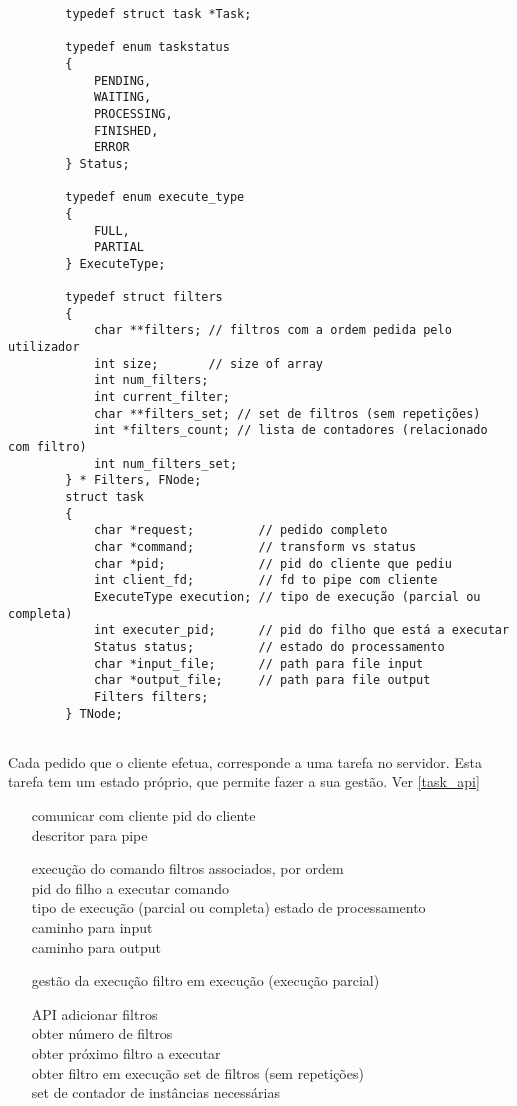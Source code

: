 \documentclass{article}
\begin{document}
\begin{verbatim}
        typedef struct task *Task;

        typedef enum taskstatus
        {
            PENDING,
            WAITING,
            PROCESSING,
            FINISHED,
            ERROR
        } Status;

        typedef enum execute_type
        {
            FULL,
            PARTIAL
        } ExecuteType;

        typedef struct filters
        {
            char **filters; // filtros com a ordem pedida pelo utilizador
            int size;       // size of array
            int num_filters;
            int current_filter;
            char **filters_set; // set de filtros (sem repetições)
            int *filters_count; // lista de contadores (relacionado com filtro)
            int num_filters_set;
        } * Filters, FNode;
        struct task
        {
            char *request;         // pedido completo
            char *command;         // transform vs status
            char *pid;             // pid do cliente que pediu
            int client_fd;         // fd to pipe com cliente
            ExecuteType execution; // tipo de execução (parcial ou completa)
            int executer_pid;      // pid do filho que está a executar
            Status status;         // estado do processamento
            char *input_file;      // path para file input
            char *output_file;     // path para file output
            Filters filters;
        } TNode;
    
\end{verbatim}

Cada pedido que o cliente efetua, corresponde a uma tarefa no servidor. Esta tarefa tem um estado próprio,
que permite fazer a sua gestão. Ver \ref{task_api}

\begin{itemize}
    \item [comunicar com cliente] {pid do cliente\\ descritor para pipe}
    \item [execução do comando] {filtros associados, por ordem \\ pid do filho a executar comando \\ tipo de execução (parcial ou completa)
          estado de processamento \\ caminho para input \\ caminho para output}
    \item [gestão da execução] { filtro em execução (execução parcial)}
    \item [API] {adicionar filtros \\ obter número de filtros \\ obter próximo filtro a executar \\ obter filtro em execução
          set de filtros (sem repetições) \\ set de contador de instâncias necessárias}
\end{itemize}
\end{document}
